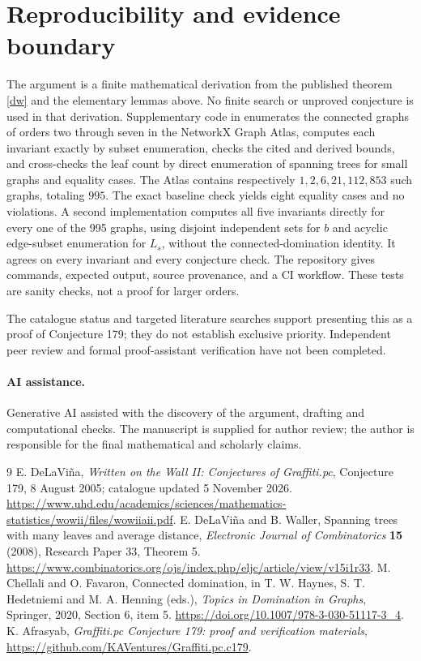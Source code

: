 \documentclass[11pt,a4paper]{article}
\begin{document}
\section{Reproducibility and evidence boundary}
The argument is a finite mathematical derivation from the published theorem \eqref{dw} and the elementary lemmas above. No finite search or unproved conjecture is used in that derivation. Supplementary code in \cite{repo} enumerates the connected graphs of orders two through seven in the NetworkX Graph Atlas, computes each invariant exactly by subset enumeration, checks the cited and derived bounds, and cross-checks the leaf count by direct enumeration of spanning trees for small graphs and equality cases. The Atlas contains respectively $1,2,6,21,112,853$ such graphs, totaling $995$. The exact baseline check yields eight equality cases and no violations. A second implementation computes all five invariants directly for every one of the 995 graphs, using disjoint independent sets for $b$ and acyclic edge-subset enumeration for $L_s$, without the connected-domination identity. It agrees on every invariant and every conjecture check. The repository gives commands, expected output, source provenance, and a CI workflow. These tests are sanity checks, not a proof for larger orders.

The catalogue status and targeted literature searches support presenting this as a proof of Conjecture 179; they do not establish exclusive priority. Independent peer review and formal proof-assistant verification have not been completed.

\paragraph{AI assistance.} Generative AI assisted with the discovery of the argument, drafting and computational checks. The manuscript is supplied for author review; the author is responsible for the final mathematical and scholarly claims.

\begin{thebibliography}{9}
 E. DeLaVi\~na, \emph{Written on the Wall II: Conjectures of Graffiti.pc}, Conjecture 179, 8 August 2005; catalogue updated 5 November 2026. \url{https://www.uhd.edu/academics/sciences/mathematics-statistics/wowii/files/wowiiaii.pdf}.
 E. DeLaVi\~na and B. Waller, Spanning trees with many leaves and average distance, \emph{Electronic Journal of Combinatorics} \textbf{15} (2008), Research Paper 33, Theorem 5. \url{https://www.combinatorics.org/ojs/index.php/eljc/article/view/v15i1r33}.
 M. Chellali and O. Favaron, Connected domination, in T. W. Haynes, S. T. Hedetniemi and M. A. Henning (eds.), \emph{Topics in Domination in Graphs}, Springer, 2020, Section 6, item 5. \url{https://doi.org/10.1007/978-3-030-51117-3_4}.
 K. Afrasyab, \emph{Graffiti.pc Conjecture 179: proof and verification materials}, \url{https://github.com/KAVentures/Graffiti.pc.c179}.
\end{thebibliography}
\end{document}
